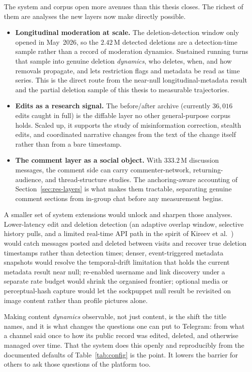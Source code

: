 The system and corpus open more avenues than this thesis closes. The richest of them are analyses the new layers now make directly possible.

\begin{itemize}
  \item \textbf{Longitudinal moderation at scale.} The deletion-detection window only opened in May~2026, so the $2.42$\,M detected deletions are a detection-time sample rather than a record of moderation dynamics. Sustained running turns that sample into genuine deletion \emph{dynamics}, who deletes, when, and how removals propagate, and lets restriction flags and metadata be read as time series. This is the direct route from the near-null longitudinal-metadata result and the partial deletion sample of this thesis to measurable trajectories.
  \item \textbf{Edits as a research signal.} The before/after archive (currently $36{,}016$ edits caught in full) is the diffable layer no other general-purpose corpus holds. Scaled up, it supports the study of misinformation correction, stealth edits, and coordinated narrative changes from the text of the change itself rather than from a bare timestamp.
  \item \textbf{The comment layer as a social object.} With $333.2$\,M discussion messages, the comment side can carry commenter-network, returning-audience, and thread-structure studies. The anchoring-aware accounting of Section~\ref{sec:res-layers} is what makes them tractable, separating genuine comment sections from in-group chat before any measurement begins.
\end{itemize}

A smaller set of system extensions would unlock and sharpen those analyses. Lower-latency edit and deletion detection (an adaptive overlap window, selective history pulls, and a limited real-time API path in the spirit of Kireev et al.~\cite{propaganda2025}) would catch messages posted and deleted between visits and recover true deletion timestamps rather than detection times; denser, event-triggered metadata snapshots would resolve the temporal-drift limitation that holds the current metadata result near null; re-enabled username and link discovery under a separate rate budget would shrink the organised frontier; optional media or perceptual-hash capture would let the sockpuppet null result be revisited on image content rather than profile pictures alone.


Making content \emph{dynamics} observable, not just content, is the shift the title names, and it is what changes the questions one can put to Telegram: from what a channel said once to how its public record was edited, deleted, and otherwise managed over time. That the system does this openly and reproducibly from the documented defaults of Table~\ref{tab:config} is the point. It lowers the barrier for others to ask those questions of the platform too.
